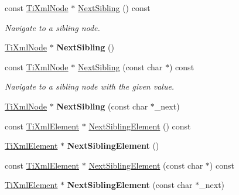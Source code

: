 \begin{DoxyCompactItemize}
const \hyperlink{classTiXmlNode}{Ti\+Xml\+Node} $\ast$ \hyperlink{classTiXmlNode_ae99c572ac7901a15993ea7a4efaa10e7}{Next\+Sibling} () const
\begin{DoxyCompactList}\small\item\em Navigate to a sibling node. \end{DoxyCompactList}\item 
\mbox{\label{classTiXmlNode_a4d05f7b1d7b470ac6887edd072d4892a}} 
\hyperlink{classTiXmlNode}{Ti\+Xml\+Node} $\ast$ {\bfseries Next\+Sibling} ()
\item 
\mbox{\label{classTiXmlNode_a0864ea784b53cdca0a37829d3391ca4b}} 
const \hyperlink{classTiXmlNode}{Ti\+Xml\+Node} $\ast$ \hyperlink{classTiXmlNode_a0864ea784b53cdca0a37829d3391ca4b}{Next\+Sibling} (const char $\ast$) const
\begin{DoxyCompactList}\small\item\em Navigate to a sibling node with the given \textquotesingle{}value\textquotesingle{}. \end{DoxyCompactList}\item 
\mbox{\label{classTiXmlNode_a4080bc5cc8a5c139e7cf308669e850fc}} 
\hyperlink{classTiXmlNode}{Ti\+Xml\+Node} $\ast$ {\bfseries Next\+Sibling} (const char $\ast$\+\_\+next)
\item 
const \hyperlink{classTiXmlElement}{Ti\+Xml\+Element} $\ast$ \hyperlink{classTiXmlNode_ac6105781c913a42aa7f3f17bd1964f7c}{Next\+Sibling\+Element} () const
\item 
\mbox{\label{classTiXmlNode_a1b211cb5034655a04358e0e2f6fc5010}} 
\hyperlink{classTiXmlElement}{Ti\+Xml\+Element} $\ast$ {\bfseries Next\+Sibling\+Element} ()
\item 
const \hyperlink{classTiXmlElement}{Ti\+Xml\+Element} $\ast$ \hyperlink{classTiXmlNode_a22def4746238abaee042f99b47ef3c94}{Next\+Sibling\+Element} (const char $\ast$) const
\item 
\mbox{\label{classTiXmlNode_a6e1ac6b800e18049bc75e9f8e63a8e5f}} 
\hyperlink{classTiXmlElement}{Ti\+Xml\+Element} $\ast$ {\bfseries Next\+Sibling\+Element} (const char $\ast$\+\_\+next)
\item 
\mbox{\label{classTiXmlNode_a12c973e1da9e90a178924b8ea5a5f4d1}} 

\end{DoxyCompactItemize}
